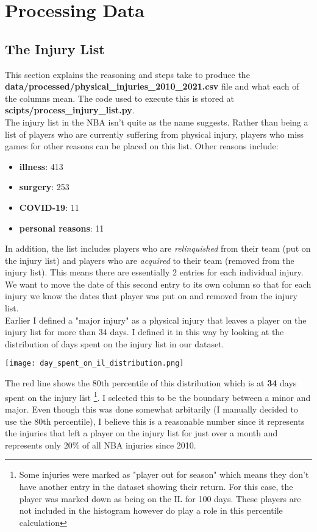 \documentclass{article}
\newcommand{\injurydef}{a physical injury that leaves a player on the injury list for more than 34 days}
\begin{document}
\section*{Processing Data}

\subsection*{The Injury List}

This section explains the reasoning and steps take to produce the \textbf{data/processed/physical\_injuries\_2010\_2021.csv}
file and what each of the columns mean. The code used to execute this is stored at
\textbf{scipts/process\_injury\_list.py}.\\

The injury list in the NBA isn't quite as the name suggests. Rather than being a list
of players who are currently suffering from physical injury, players who miss games
for other reasons can be placed on this list. Other reasons include:

\begin{itemize}
    \item \textbf{illness}: 413
    \item \textbf{surgery}: 253
    \item \textbf{COVID-19}: 11
    \item \textbf{personal reasons}: 11
\end{itemize}

In addition, the list includes players who are \emph{relinquished} from their team
(put on the injury list) and players who are \emph{acquired} to their team (removed
from the injury list). This means there are essentially 2 entries for
each individual injury. We want to move the date of this second entry to its own column
so that for each injury we know the dates that player was put on and removed from the
injury list.\\

Earlier I defined a "major injury" as \injurydef. I defined it in this way
by looking at the distribution of days spent on the injury list in our dataset.

\begin{center}
    \texttt{[image: day\_spent\_on\_il\_distribution.png]}
\end{center}

The red line shows the 80th percentile of this distribution which is at
\textbf{34} days spent on the injury list
\footnote{Some injuries were marked as "player out for season" which means they don't have another entry in the
dataset showing their return. For this case, the player was marked down as being on the IL for 100 days. These players
are not included in the histogram however do play a role in this percentile calculation}.
I selected this to be the boundary between a minor and major. Even though this was done somewhat
arbitarily (I manually decided to use the 80th percentile), I believe this is a
reasonable number since it represents the injuries that left a player on the injury
list for just over a month and represents only 20\% of all NBA injuries since 2010.\\
\end{document}
